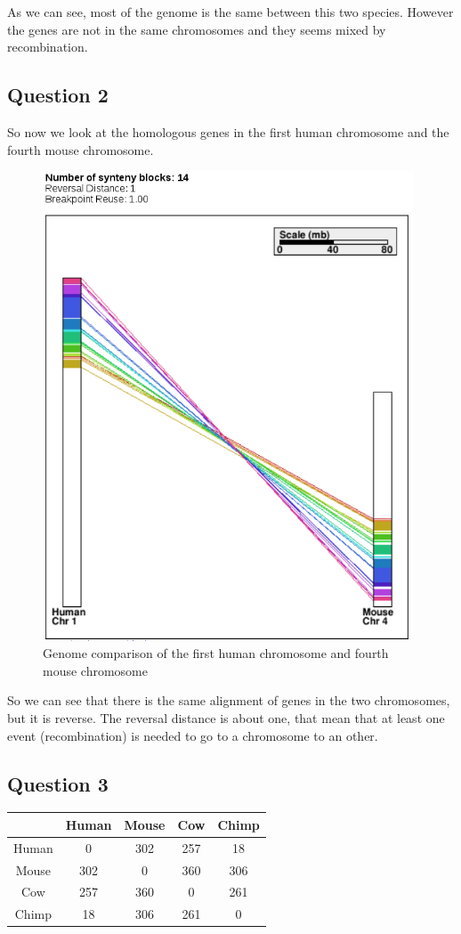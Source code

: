 \documentclass[]{article}
\begin{document}
As we can see, most of the genome is the same between this two species. However the genes are not in the same chromosomes and they seems mixed by recombination.


\subsection{Question 2}
So now we look at the homologous genes in the first human chromosome and the fourth mouse chromosome.
\begin{figure}[H]
	\includegraphics*[width = 11cm]{../H1_M4.png}
	\caption{\label{h1_m4} Genome comparison of the first human chromosome and fourth mouse chromosome }
\end{figure}
So we can see that there is the same alignment of genes in the two chromosomes, but it is reverse. The reversal distance is about one, that mean that at least one event (recombination) is needed to go to a chromosome to an other.   
\subsection{Question 3}

\begin{tabular}{|*{5}{c|}}
	\hline
	   & Human  & Mouse  & Cow  & Chimp \\
	\hline
	Human  & 0  & 302  & 257  & 18 \\
	\hline
	Mouse  & 302  & 0  & 360 & 306 \\
	\hline
	Cow  & 257  & 360 & 0 & 261 \\
	\hline
	Chimp  & 18 & 306 & 261 & 0 \\
	\hline
	
\end{tabular}
\end{document}
